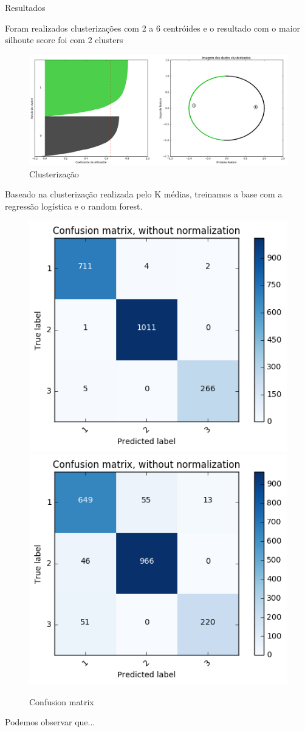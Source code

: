 \documentclass[final,hyperref={pdfpagelabels=false}]{beamer}
\begin{document}
\begin{frame}[t]
\begin{columns}[t]
\begin{column}{.465\textwidth}

\begin{block}{Resultados}

Foram realizados clusterizações com 2 a 6 centróides e o resultado com o maior silhoute score foi com 2 clusters

\begin{figure}
\includegraphics[width=0.85\linewidth]{silhoute2.png}
\caption{Clusterização}
\end{figure}

Baseado na clusterização realizada pelo K médias, treinamos a base com a regressão logística e o random forest.

\begin{figure}
\includegraphics[width=0.4\linewidth]{confusionMatrix.png}
\vspace{1cm}
\includegraphics[width=0.4\linewidth]{confusionMatrixRanFor.png}
\caption{Confusion matrix}
\end{figure}

Podemos observar que...



\end{block}
\end{column}
\end{columns}
\end{frame}
\end{document}
